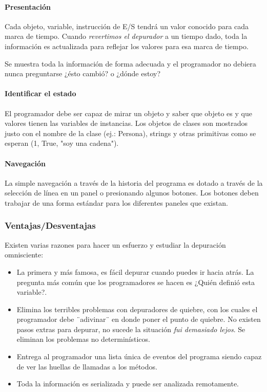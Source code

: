 \documentclass[12pt,legalpaper]{report}
\begin{document}
				\paragraph{Presentación}

Cada objeto, variable, instrucción de E/S tendrá un valor conocido para cada marca de tiempo.  Cuando \textit{revertimos el depurador} a un tiempo dado, toda la información es actualizada para reflejar los valores para esa marca de tiempo.

Se muestra toda la información de forma adecuada y el programador no debiera nunca preguntarse ¿ésto cambió? o ¿dónde estoy?

				\paragraph{Identificar el estado}

El programador debe ser capaz de mirar un objeto y saber que objeto es y que valores tienen las variables de instancias.  Los objetos de clases son mostrados justo con el nombre de la clase (ej.: Persona), strings y otras primitivas como se esperan (1, True, "soy una cadena").

				\paragraph{Navegación}

La simple navegación a través de la historia del programa es dotado a través de la selección de línea en un panel o presionando algunos botones.  Los botones deben trabajar de una forma estándar para los diferentes paneles que existan.


			\subsubsection{Ventajas/Desventajas}

Existen varias razones para hacer un esfuerzo y estudiar la depuración omnisciente:

\begin{itemize}
	\item La primera y más famosa, es fácil depurar cuando puedes ir hacia atrás.  La pregunta más común que los programadores se hacen es ¿Quién definió esta variable?.

	\item Elimina los terribles problemas con depuradores de quiebre, con los cuales el programador debe ¨adivinar¨ en donde poner el punto de quiebre.  No existen pasos extras para depurar, no sucede la situación \textit{fui demasiado lejos}.  Se eliminan los problemas no determinísticos.

	\item Entrega al programador una lista única de eventos del programa siendo capaz de ver las huellas de llamadas a los métodos.

	\item Toda la información es serializada y puede ser analizada remotamente.
\end{itemize}
\end{document}
